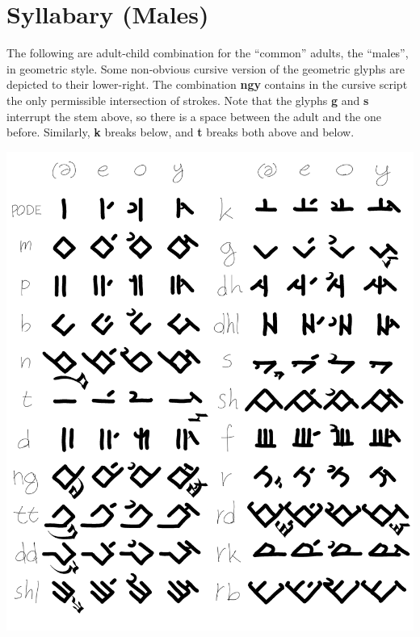 \documentclass[10pt,oneside]{memoir}
\begin{document}
\section{Syllabary (Males)}
The following are adult-child combination for the ``common'' adults, the ``males'', in geometric style. Some non-obvious cursive version of the geometric glyphs are depicted to their lower-right. The combination \textbf{ngy} contains in the cursive script the only permissible intersection of strokes. Note that the glyphs \textbf{g} and \textbf{s} interrupt the stem above, so there is a space between the adult and the one before. Similarly, \textbf{k} breaks below, and \textbf{t} breaks both above and below.

\begin{center}
    \includegraphics[scale=0.60]{syllabary_males}
\end{center}


\end{document}
